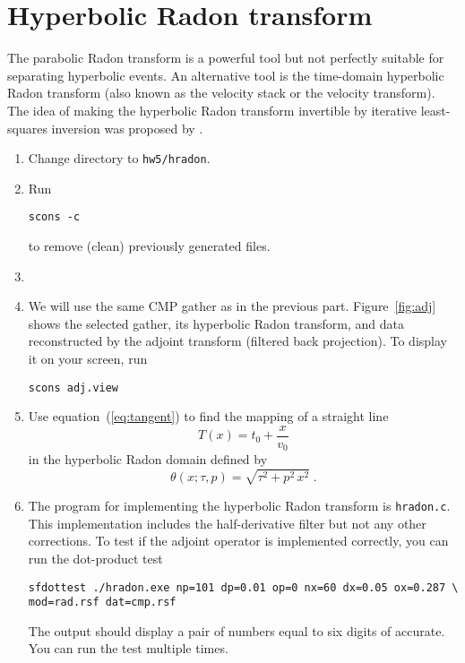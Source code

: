\section{Hyperbolic Radon transform}

The parabolic Radon transform is a powerful tool but not perfectly
suitable for separating hyperbolic events. An alternative tool is the
time-domain hyperbolic Radon transform (also known as the velocity
stack or the velocity transform). The idea of making the hyperbolic
Radon transform invertible by iterative least-squares inversion was
proposed by \cite{GEO50-12-27272741}.

\begin{enumerate}

\item Change directory to \texttt{hw5/hradon}.
\item Run
\begin{verbatim}
scons -c
\end{verbatim}
to remove (clean) previously generated files.


\item 

\item We will use the same CMP gather as in the previous part. Figure~\ref{fig:adj} shows the selected gather, its hyperbolic Radon transform, and data reconstructed by the adjoint transform (filtered back projection). To display it on your screen, run
\begin{verbatim}
scons adj.view
\end{verbatim}

\item Use equation~(\ref{eq:tangent}) to find the mapping of a straight line
\begin{equation}
\label{eq:line}
T(x) = \displaystyle t_0 + \frac{x}{v_0}
\end{equation}
in the hyperbolic Radon domain defined by
\begin{equation}
\label{eq:hradon}
\theta(x;\tau,p) = \displaystyle \sqrt{\tau^2 + p^2\,x^2}\;.
\end{equation}

\answer{}

\item The program for implementing the hyperbolic Radon transform is \texttt{hradon.c}. This implementation includes the half-derivative filter but not any other corrections. To test if the adjoint operator is implemented correctly, you can run the dot-product test
\begin{verbatim}
sfdottest ./hradon.exe np=101 dp=0.01 op=0 nx=60 dx=0.05 ox=0.287 \
mod=rad.rsf dat=cmp.rsf
\end{verbatim}
The output should display a pair of numbers equal to six digits of accurate. You can run the test multiple times.


\end{enumerate}
